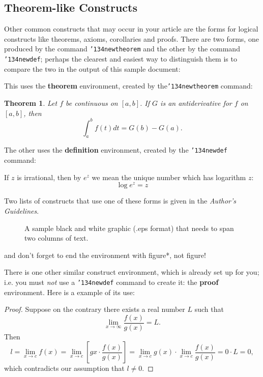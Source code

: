 \documentclass{acm_proc_article-sp}
\begin{document}
\subsection{Theorem-like Constructs}
Other common constructs that may occur in your article are
the forms for logical constructs like theorems, axioms,
corollaries and proofs.  There are
two forms, one produced by the
command \texttt{{\char'134}newtheorem} and the
other by the command \texttt{{\char'134}newdef}; perhaps
the clearest and easiest way to distinguish them is
to compare the two in the output of this sample document:

This uses the \textbf{theorem} environment, created by
the\linebreak\texttt{{\char'134}newtheorem} command:
\newtheorem{theorem}{Theorem}
\begin{theorem}
Let $f$ be continuous on $[a,b]$.  If $G$ is
an antiderivative for $f$ on $[a,b]$, then
\begin{displaymath}\int^b_af(t)dt = G(b) - G(a).\end{displaymath}
\end{theorem}

The other uses the \textbf{definition} environment, created
by the \texttt{{\char'134}newdef} command:
\begin{definition}
If $z$ is irrational, then by $e^z$ we mean the
unique number which has
logarithm $z$: \begin{displaymath}{\log e^z = z}\end{displaymath}
\end{definition}

Two lists of constructs that use one of these
forms is given in the
\textit{Author's  Guidelines}.

\begin{figure*}
\centering
{}
\caption{A sample black and white graphic (.eps format)
that needs to span two columns of text.}
\end{figure*}
and don't forget to end the environment with
{figure*}, not {figure}!
 
There is one other similar construct environment, which is
already set up
for you; i.e. you must \textit{not} use
a \texttt{{\char'134}newdef} command to
create it: the \textbf{proof} environment.  Here
is a example of its use:
\begin{proof}
Suppose on the contrary there exists a real number $L$ such that
\begin{displaymath}
\lim_{x\rightarrow\infty} \frac{f(x)}{g(x)} = L.
\end{displaymath}
Then
\begin{displaymath}
l=\lim_{x\rightarrow c} f(x)
= \lim_{x\rightarrow c}
\left[ g{x} \cdot \frac{f(x)}{g(x)} \right ]
= \lim_{x\rightarrow c} g(x) \cdot \lim_{x\rightarrow c}
\frac{f(x)}{g(x)} = 0\cdot L = 0,
\end{displaymath}
which contradicts our assumption that $l\neq 0$.
\end{proof}
\end{document}
